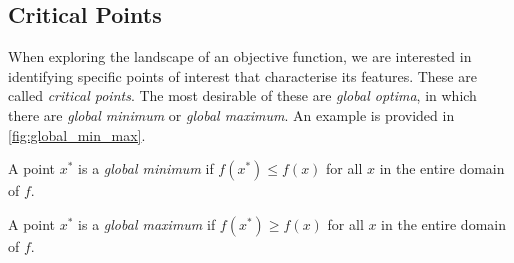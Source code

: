 \subsection{Critical Points}
\label{ssec:critical_points}

When exploring the landscape of an objective function, we are interested in identifying specific points of interest that characterise its features. These are called \textit{critical points}. The most desirable of these are \textit{global optima}, in which there are \textit{global minimum} or \textit{global maximum}. An example is provided in \cref{fig:global_min_max}.

\begin{definition}
    A point $x^*$ is a \textit{global minimum} if $f(x^*) \leq f(x)$ for all $x$ in the entire domain of $f$.
\end{definition}

\begin{definition}
    A point $x^*$ is a \textit{global maximum} if $f(x^*) \geq f(x)$ for all $x$ in the entire domain of $f$.
\end{definition}

